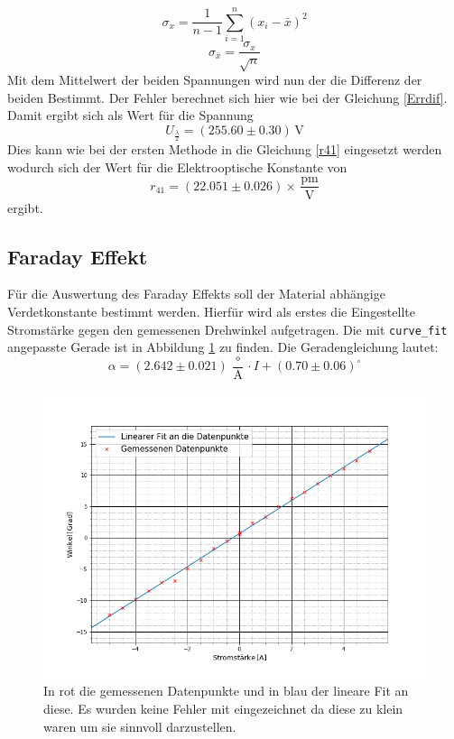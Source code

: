 \begin{equation}
\sigma_x = \frac{1}{n-1}\sum_{i=1}^{n}(x_i-\bar{x})^2
\label{Mean}
\end{equation}
\begin{equation}
	\sigma_{\bar{x}}=\frac{\sigma_x}{\sqrt{n}}
	\label{ErrMean}
\end{equation}
Mit dem Mittelwert der beiden Spannungen wird nun der die Differenz der beiden Bestimmt. Der Fehler berechnet sich hier wie bei der Gleichung \ref{Errdif}.
Damit ergibt sich als Wert für die Spannung $$U_{\frac{\lambda}{2}}=(255.60\pm0.30)\,\text{V}$$ 
Dies kann wie bei der ersten Methode in die Gleichung \ref{r41}
eingesetzt werden wodurch sich der Wert für die Elektrooptische Konstante von
$$r_{41}=(22.051\pm 0.026)\times\,\frac{\text{pm}}{\text{V}}$$
ergibt.

\subsection{Faraday Effekt}
Für die Auswertung des Faraday Effekts soll der Material abhängige Verdetkonstante bestimmt werden. Hierfür wird als erstes die Eingestellte Stromstärke gegen den gemessenen Drehwinkel aufgetragen. Die mit \verb|curve_fit| angepasste Gerade ist in Abbildung \ref{Dreh} zu finden. Die Geradengleichung lautet:
$$\alpha=(2.642\pm0.021)\,\frac{\circ}{\text{A}}\cdot I + (0.70\pm0.06)^\circ$$
\begin{figure}[ht]
	\includegraphics[scale=0.5]{Bild/V2Lin}
	\centering
	\caption[Datenpunkte und Fit der Faraday Messung]{\small In rot die gemessenen Datenpunkte und in blau der lineare Fit an diese. Es wurden keine Fehler mit eingezeichnet da diese zu klein waren um sie sinnvoll darzustellen.}
	\label{Dreh}
\end{figure}
